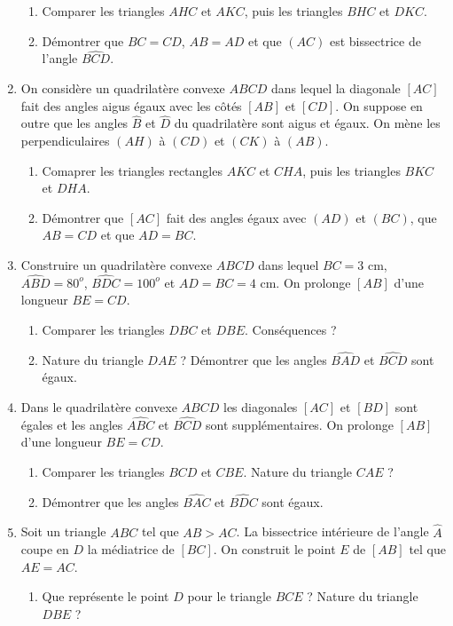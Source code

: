\begin{enumerate}
\begin{enumerate}
\item Comparer les triangles $AHC$ et $AKC$, puis les triangles $BHC$ et $DKC$.
\item Démontrer que $BC=CD$, $AB=AD$ et que $(AC)$ est bissectrice de l'angle
$\widehat{BCD}$.
\end{enumerate}
\item On considère un quadrilatère convexe $ABCD$ dans lequel la diagonale $[AC]$ 
fait des angles aigus égaux avec les côtés $[AB]$ et $[CD]$. On suppose en outre que les angles $\widehat{B}$ et $\widehat{D}$ du quadrilatère sont aigus et égaux. On mène les perpendiculaires $(AH)$ à $(CD)$ et $(CK)$ à $(AB)$.\begin{enumerate}
\item Comaprer les triangles rectangles $AKC$ et $CHA$, puis les triangles $BKC$ et $DHA$. \item Démontrer que $[AC]$ fait des angles égaux avec $(AD)$ et $(BC)$, que $AB=CD$ et que $AD=BC$.
\end{enumerate}
\item Construire un quadrilatère convexe $ABCD$ dans lequel $BC=3$ cm, $\widehat{ABD}=80^o$, $\widehat{BDC}=100^o$ et $AD=BC=4$ cm. On prolonge $[AB]$ d'une longueur $BE=CD$. \begin{enumerate}
\item Comparer les triangles $DBC$ et $DBE$. Conséquences ? 
\item Nature du triangle $DAE$ ? Démontrer que les angles $\widehat{BAD}$ et $\widehat{BCD}$ sont égaux.
\end{enumerate}
\item Dans le quadrilatère convexe $ABCD$ les diagonales $[AC]$ et $[BD]$ sont égales et les angles $\widehat{ABC}$ et $\widehat{BCD}$ sont supplémentaires. On prolonge $[AB]$ d'une longueur $BE=CD$. \begin{enumerate}
\item Comparer les triangles $BCD$ et $CBE$. Nature du triangle $CAE$ ? 
\item Démontrer que les angles $\widehat{BAC}$ et $\widehat{BDC}$ sont égaux.
\end{enumerate}
\item Soit un triangle $ABC$ tel que $AB>AC$. La bissectrice intérieure de l'angle
$\widehat{A}$ coupe en $D$ la médiatrice de $[BC]$. On construit le point $E$ de $[AB]$ tel que $AE=AC$. \begin{enumerate}
\item Que représente le point $D$ pour le triangle $BCE$ ? Nature du triangle $DBE$ ?

\end{enumerate}
\end{enumerate}
